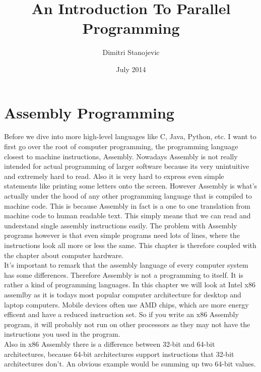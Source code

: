 \documentclass{scrreprt}
\title{An Introduction To Parallel Programming}
\author{Dimitri Stanojevic}
\date{July 2014}
\begin{document}
\maketitle
\tableofcontents


\chapter{Assembly Programming}
Before we dive into more high-level languages like C, Java, Python, etc. I want to first go over the root of computer programming, the programming language closest to machine instructions, Assembly. Nowadays Assembly is not really intended for actual programming of larger software because its very unintuitive and extremely hard to read. Also it is very hard to express even simple statements like printing some letters onto the screen. However Assembly is what's actually under the hood of any other programming language that is compiled to machine code. This is because Assembly in fact is a one to one translation from machine code to human readable text. This simply means that we can read and understand single assembly instructions easily. The problem with Assembly programs however is that even simple programs need lots of lines, where the instructions look all more or less the same. This chapter is therefore coupled with the chapter about computer hardware. \\
It's important to remark that the assembly language of every computer system has some differences. Therefore Assembly is not a programming to itself. It is rather a kind of programming languages. In this chapter we will look at Intel x86 assemlby as it is todays most popular computer architecture for desktop and laptop computers. Mobile devices often use AMD chips, which are more energy efficent and have a reduced instruction set. So if you write an x86 Assembly program, it will probably not run on other processors as they may not have the instructions you used in the program. \\
Also in x86 Assembly there is a difference between 32-bit and 64-bit architectures, because 64-bit architectures support instructions that 32-bit architectures don't. An obvious example would be summing up two 64-bit values. \\
\end{document}
